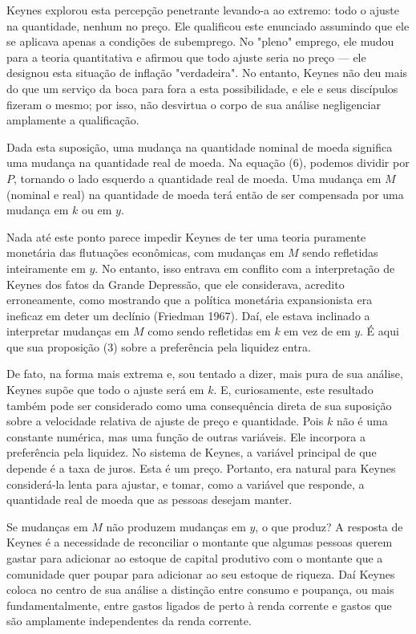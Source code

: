 \documentclass[12pt]{article}
\begin{document}
Keynes explorou esta percepção penetrante levando-a ao extremo: todo o ajuste na quantidade, nenhum no preço. Ele qualificou este enunciado assumindo que ele se aplicava apenas a condições de subemprego. No "pleno" emprego, ele mudou para a teoria quantitativa e afirmou que todo ajuste seria no preço — ele designou esta situação de inflação "verdadeira". No entanto, Keynes não deu mais do que um serviço da boca para fora a esta possibilidade, e ele e seus discípulos fizeram o mesmo; por isso, não desvirtua o corpo de sua análise negligenciar amplamente a qualificação.

Dada esta suposição, uma mudança na quantidade nominal de moeda significa uma mudança na quantidade real de moeda. Na equação (6), podemos dividir por $P$, tornando o lado esquerdo a quantidade real de moeda. Uma mudança em $M$ (nominal e real) na quantidade de moeda terá então de ser compensada por uma mudança em $k$ ou em $y$.

Nada até este ponto parece impedir Keynes de ter uma teoria puramente monetária das flutuações econômicas, com mudanças em $M$ sendo refletidas inteiramente em $y$. No entanto, isso entrava em conflito com a interpretação de Keynes dos fatos da Grande Depressão, que ele considerava, acredito erroneamente, como mostrando que a política monetária expansionista era ineficaz em deter um declínio (Friedman 1967). Daí, ele estava inclinado a interpretar mudanças em $M$ como sendo refletidas em $k$ em vez de em $y$. É aqui que sua proposição (3) sobre a preferência pela liquidez entra.

De fato, na forma mais extrema e, sou tentado a dizer, mais pura de sua análise, Keynes supõe que todo o ajuste será em $k$. E, curiosamente, este resultado também pode ser considerado como uma consequência direta de sua suposição sobre a velocidade relativa de ajuste de preço e quantidade. Pois $k$ não é uma constante numérica, mas uma função de outras variáveis. Ele incorpora a preferência pela liquidez. No sistema de Keynes, a variável principal de que depende é a taxa de juros. Esta é um preço. Portanto, era natural para Keynes considerá-la lenta para ajustar, e tomar, como a variável que responde, a quantidade real de moeda que as pessoas desejam manter.

Se mudanças em $M$ não produzem mudanças em $y$, o que produz? A resposta de Keynes é a necessidade de reconciliar o montante que algumas pessoas querem gastar para adicionar ao estoque de capital produtivo com o montante que a comunidade quer poupar para adicionar ao seu estoque de riqueza. Daí Keynes coloca no centro de sua análise a distinção entre consumo e poupança, ou mais fundamentalmente, entre gastos ligados de perto à renda corrente e gastos que são amplamente independentes da renda corrente.
\end{document}
